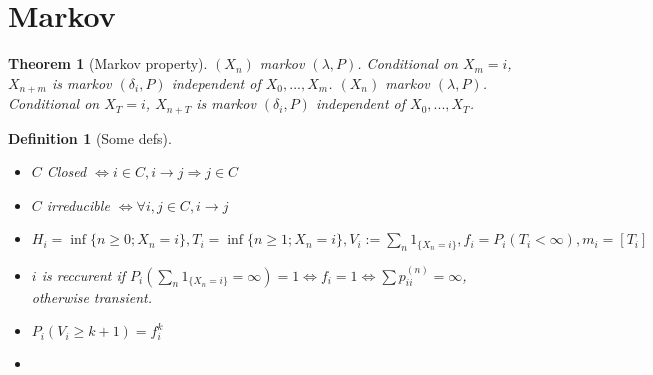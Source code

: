 \documentclass{article}
\newtheorem{theorem}{Theorem}
\newtheorem{definition}{Definition}
\begin{document}
\section{Markov}
\begin{theorem}[Markov property]
  $(X_n)$ markov $(\lambda, P)$. Conditional on $X_m = i$, $X_{n+m}$ is markov $(\delta_i, P)$ independent of $X_0, ..., X_m$.
  $(X_n)$ markov $(\lambda, P)$. Conditional on $X_T = i$, $X_{n+T}$ is markov $(\delta_i, P)$ independent of $X_0, ..., X_T$.
\end{theorem}
\begin{definition}[Some defs]
  \begin{itemize}
  \item $C$ Closed $\iff i \in C, i \rightarrow j \Rightarrow j \in C$
  \item $C$ irreducible $\iff \forall i, j \in C, i \rightarrow j$
  \item $H_i = \inf\{ n \ge 0; X_n = i\}, T_i = \inf\{n \ge 1; X_n = i \}, V_i := \sum_n 1_{\{X_n = i\}}, f_i = P_i(T_i < \infty), m_i = [T_i]$
  \item 
    $i$ is reccurent if $P_i(\sum_n 1_{\{X_n = i\}} = \infty) = 1 \iff f_i = 1 \iff \sum p_{ii}^{(n)} = \infty$, otherwise transient.
  \item $P_i(V_i \ge k + 1) = f_i^k$
  \item 
  \end{itemize}
\end{definition}
\end{document}

